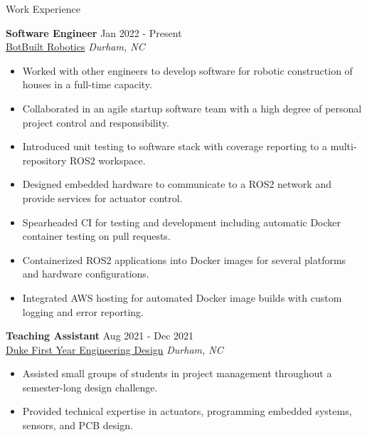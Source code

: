 \documentclass{resume}
\begin{document}
\begin{rSection}{Work Experience}

\textbf{Software Engineer} \hfill Jan 2022 - Present\\
\href{https://botbuilt.com}{BotBuilt Robotics} \hfill \textit{Durham, NC}
\begin{itemize}
    \itemsep -3pt {} 
    \item Worked with other engineers to develop software for robotic construction of houses in a full-time capacity.
    \item Collaborated in an agile startup software team with a high degree of personal project control and responsibility.
    \item Introduced unit testing to software stack with coverage reporting to a multi-repository ROS2 workspace.
    \item Designed embedded hardware to communicate to a ROS2 network and provide services for actuator control.
    \item Spearheaded CI for testing and development including automatic Docker container testing on pull requests.
    \item Containerized ROS2 applications into Docker images for several platforms and hardware configurations.
    \item Integrated AWS hosting for automated Docker image builds with custom logging and error reporting.
    \end{itemize}
 
\textbf{Teaching Assistant} \hfill Aug 2021 - Dec 2021\\
\href{https://fyd.duke.edu/}{Duke First Year Engineering Design} \hfill \textit{Durham, NC}
\begin{itemize}
    \itemsep -3pt {} 
    \item Assisted small groups of students in project management throughout a semester-long design challenge.
    \item Provided technical expertise in actuators, programming embedded systems, sensors, and PCB design.\
\end{itemize}

\end{rSection} 

\end{document}
